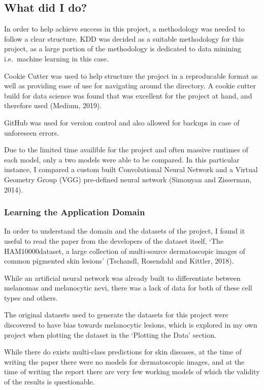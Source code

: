 \documentclass[11pt]{article}
\begin{document}
    \hypertarget{what-did-i-do}{%
\subsection{What did I do?}\label{what-did-i-do}}

In order to help achieve success in this project, a methodology was
needed to follow a clear structure. KDD was decided as a suitable
methodology for this project, as a large portion of the methodology is
dedicated to data minining i.e.~machine learning in this case.

Cookie Cutter was used to help structure the project in a reproducable
format as well as providing ease of use for navigating around the
directory. A cookie cutter build for data science was found that was
excellent for the project at hand, and therefore used (Medium, 2019).

GitHub was used for version control and also allowed for backups in case
of unforeseen errors.

Due to the limited time availible for the project and often massive
runtimes of each model, only a two models were able to be compared. In
this particular instance, I compared a custom built Convolutional Neural
Network and a Virtual Geometry Group (VGG) pre-defined neural network
(Simonyan and Zisserman, 2014).

    \hypertarget{learning-the-application-domain}{%
\subsubsection{Learning the Application
Domain}\label{learning-the-application-domain}}

In order to understand the domain and the datasets of the project, I
found it useful to read the paper from the developers of the dataset
itself, `The HAM10000dataset, a large collection of multi-source
dermatoscopic images of common pigmented skin lesions' (Tschandl,
Rosendahl and Kittler, 2018).

While an artificial neural network was already built to differentiate
between melanomas and melanocytic nevi, there was a lack of data for
both of these cell types and others.

The original datasets used to generate the datasets for this project
were discovered to have bias towards melanocytic lesions, which is
explored in my own project when plotting the dataset in the `Plotting
the Data' section.

While there do exists multi-class predictions for skin diseases, at the
time of writing the paper there were no models for dermatoscopic images,
and at the time of writing the report there are very few working models
of which the validity of the results is questionable.
\end{document}
